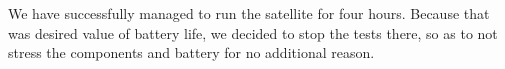 \documentclass[class=report, crop=false]{standalone}
\begin{document}
We have successfully managed to run the satellite for four hours. Because that was desired value of battery life, we decided to stop the tests there, so as to not stress the components and battery for no additional reason.
\end{document}
